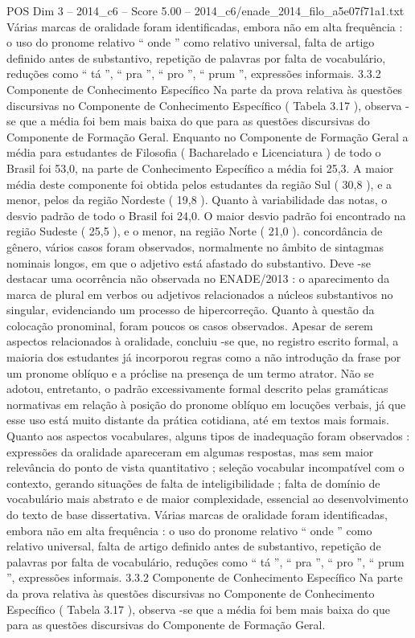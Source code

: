 \begin{textsample}{POS Dim 3 – 2014\_c6 – Score 5.00 – 2014\_c6/enade\_2014\_filo\_a5e07f71a1.txt}
Várias marcas de oralidade foram identificadas, embora não em alta frequência : o uso do pronome relativo “ onde ” como relativo universal, falta de artigo definido antes de substantivo, repetição de palavras por falta de vocabulário, reduções como “ tá ”, “ pra ”, “ pro ”, “ prum ”, expressões informais. 3.3.2 Componente de Conhecimento Específico Na parte da prova relativa às questões discursivas no Componente de Conhecimento Específico ( Tabela 3.17 ), observa -se que a média foi bem mais baixa do que para as questões discursivas do Componente de Formação Geral.
Enquanto no Componente de Formação Geral a média para estudantes de Filosofia ( Bacharelado e Licenciatura ) de todo o Brasil foi 53,0, na parte de Conhecimento Específico a média foi 25,3.
A maior média deste componente foi obtida pelos estudantes da região Sul ( 30,8 ), e a menor, pelos da região Nordeste ( 19,8 ).
Quanto à variabilidade das notas, o desvio padrão de todo o Brasil foi 24,0.
O maior desvio padrão foi encontrado na região Sudeste ( 25,5 ), e o menor, na região Norte ( 21,0 ). concordância de gênero, vários casos foram observados, normalmente no âmbito de sintagmas nominais longos, em que o adjetivo está afastado do substantivo.
Deve -se destacar uma ocorrência não observada no ENADE/2013 : o aparecimento da marca de plural em verbos ou adjetivos relacionados a núcleos substantivos no singular, evidenciando um processo de hipercorreção.
Quanto à questão da colocação pronominal, foram poucos os casos observados.
Apesar de serem aspectos relacionados à oralidade, concluiu -se que, no registro escrito formal, a maioria dos estudantes já incorporou regras como a não introdução da frase por um pronome oblíquo e a próclise na presença de um termo atrator.
Não se adotou, entretanto, o padrão excessivamente formal descrito pelas gramáticas normativas em relação à posição do pronome oblíquo em locuções verbais, já que esse uso está muito distante da prática cotidiana, até em textos mais formais.
Quanto aos aspectos vocabulares, alguns tipos de inadequação foram observados : expressões da oralidade apareceram em algumas respostas, mas sem maior relevância do ponto de vista quantitativo ; seleção vocabular incompatível com o contexto, gerando situações de falta de inteligibilidade ; falta de domínio de vocabulário mais abstrato e de maior complexidade, essencial ao desenvolvimento do texto de base dissertativa.
Várias marcas de oralidade foram identificadas, embora não em alta frequência : o uso do pronome relativo “ onde ” como relativo universal, falta de artigo definido antes de substantivo, repetição de palavras por falta de vocabulário, reduções como “ tá ”, “ pra ”, “ pro ”, “ prum ”, expressões informais. 3.3.2 Componente de Conhecimento Específico Na parte da prova relativa às questões discursivas no Componente de Conhecimento Específico ( Tabela 3.17 ), observa -se que a média foi bem mais baixa do que para as questões discursivas do Componente de Formação Geral.

\end{textsample}
